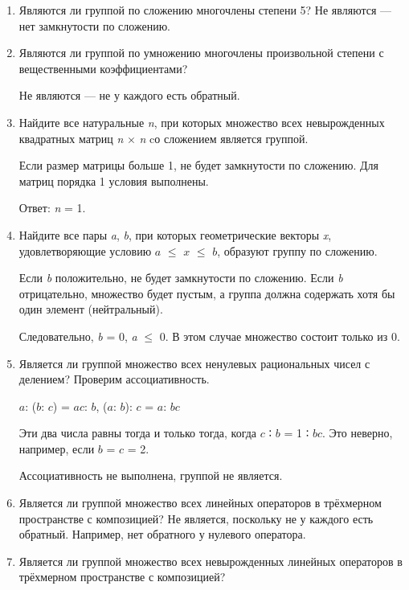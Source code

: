 \documentclass[12pt]{article}
\begin{document}
\begin{enumerate}
    \def\labelenumi{\arabic{enumi}.}
    \item
          Являются ли группой по сложению многочлены степени 5? Не являются ---
          нет замкнутости по сложению.
    \item
          Являются ли группой по умножению многочлены произвольной степени с
          вещественными коэффициентами?

          Не являются --- не у каждого есть обратный.

    \item
          Найдите все натуральные \emph{n}, при которых множество всех
          невырожденных квадратных матриц \emph{n} $\times$ \emph{n} cо сложением
          является группой.

          Если размер матрицы больше 1, не будет замкнутости по сложению. Для
          матриц порядка 1 условия выполнены.

          Ответ: \emph{n} = 1.

    \item
          Найдите все пары \emph{a}, \emph{b}, при которых геометрические
          векторы \emph{x}, удовлетворяющие условию $a$ $\leq$ $x$ $\leq$ $b$, образуют группу
          по сложению.

          Если \emph{b} положительно, не будет замкнутости по сложению. Если
          \emph{b} отрицательно, множество будет пустым, а группа должна содержать
          хотя бы один элемент (нейтральный).

          Следовательно, \emph{b} = 0, \emph{a} $\leq$ 0. В этом случае множество
          состоит только из 0.

    \item
          Является ли группой множество всех ненулевых рациональных чисел с
          делением? Проверим ассоциативность.

          $a$: ($b$: $c$) = $a$$c$: $b$, ($a$: $b$): $c$ = $a$: $b$$c$

              Эти два числа равны тогда и только тогда, когда $c$ ∶ $b$ = 1 ∶ $b$$c$. Это
              неверно, например, если $b$ = $c$ = 2.

          Ассоциативность не выполнена, группой не является.

    \item
          Является ли группой множество всех линейных операторов в трёхмерном
          пространстве с композицией? Не является, поскольку не у каждого есть
          обратный. Например, нет обратного у нулевого оператора.
    \item
          Является ли группой множество всех невырожденных линейных операторов в
          трёхмерном пространстве с композицией?


\end{enumerate}
\end{document}
